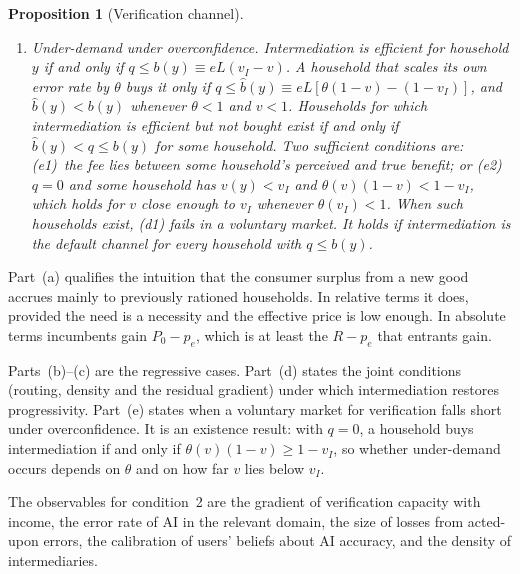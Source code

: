 \documentclass[12pt]{article}
\newtheorem{proposition}{Proposition}
\theoremstyle{remark}
\begin{document}
\begin{proposition}[Verification channel]
\begin{enumerate}[label=(\alph*),itemsep=1pt]
\[
n\ \ge\ n^*\equiv\frac{F}{(1-\eta)R(y_L)-p-m-e(1-v_I)L};
\]
and (d3)~the conditions of Lemma~\ref{lem:schedule} hold for the self-verifying households above the cutoff.
\item \emph{Under-demand under overconfidence.} Intermediation is efficient for household $y$ if and only if $q\le b(y)\equiv eL(v_I-v)$. A household that scales its own error rate by $\theta$ buys it only if $q\le\hat b(y)\equiv eL[\theta(1-v)-(1-v_I)]$, and $\hat b(y)<b(y)$ whenever $\theta<1$ and $v<1$. Households for which intermediation is efficient but not bought exist if and only if $\hat b(y)<q\le b(y)$ for some household. Two sufficient conditions are: (e1)~the fee lies between some household's perceived and true benefit; or (e2)~$q=0$ and some household has $v(y)<v_I$ and $\theta(v)(1-v)<1-v_I$, which holds for $v$ close enough to $v_I$ whenever $\theta(v_I)<1$. When such households exist, (d1) fails in a voluntary market. It holds if intermediation is the default channel for every household with $q\le b(y)$.
\end{enumerate}
\end{proposition}

Part~(a) qualifies the intuition that the consumer surplus from a new good accrues mainly to previously rationed households. In relative terms it does, provided the need is a necessity and the effective price is low enough. In absolute terms incumbents gain $P_0-p_e$, which is at least the $R-p_e$ that entrants gain.

Parts~(b)--(c) are the regressive cases. Part~(d) states the joint conditions (routing, density and the residual gradient) under which intermediation restores progressivity. Part~(e) states when a voluntary market for verification falls short under overconfidence. It is an existence result: with $q=0$, a household buys intermediation if and only if $\theta(v)(1-v)\ge1-v_I$, so whether under-demand occurs depends on $\theta$ and on how far $v$ lies below $v_I$.

The observables for condition~2 are the gradient of verification capacity with income, the error rate of AI in the relevant domain, the size of losses from acted-upon errors, the calibration of users' beliefs about AI accuracy, and the density of intermediaries.
\end{document}
